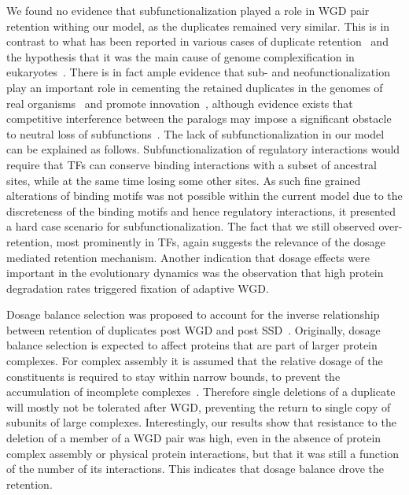 We found no evidence that subfunctionalization played a role in WGD pair retention withing our model, as the duplicates remained very similar. This is in contrast to what has been reported in various cases of duplicate retention~\cite{force_preservation_1999,blanc_functional_2004,duarte_expression_2006,hoof_conserved_2005,wapinski_gene_2010} and the hypothesis that it was the main cause of genome complexification in eukaryotes~\cite{lynch_origins_2003}. There is in fact ample evidence that sub- and neofunctionalization play an important role in cementing the retained duplicates in the genomes of real organisms~\cite{blanc_functional_2004,bekaert_two-phase_2011} and promote innovation~\cite{huminiecki_2r_2010,huminiecki_polyploidy_2012,de_smet_redundancy_2012}, although evidence exists that competitive interference between the paralogs may impose a significant obstacle to neutral loss of subfunctions~\cite{baker_following_2013}. 
The lack of subfunctionalization in our model can be explained as follows. Subfunctionalization of regulatory interactions would require that TFs can conserve binding interactions with a subset of ancestral sites, while at the same time losing some other sites. As such fine grained alterations of binding motifs was not possible within the current model due to the discreteness of the binding motifs and hence regulatory interactions, it presented a hard case scenario for subfunctionalization. The fact that we still observed over-retention, most prominently in TFs, again suggests the relevance of the dosage mediated retention mechanism. Another indication that dosage effects were important in the evolutionary dynamics was the observation that high protein degradation rates triggered fixation of adaptive WGD. 

Dosage balance selection was proposed to account for the inverse relationship between retention of duplicates post WGD and post SSD~\cite{birchler_gene_2007,hakes_all_2007,freeling_bias_2009,makino_ohnologs_2010,birchler_gene_2010,rodgers-melnick_contrasting_2012}. Originally, dosage balance selection is expected to affect proteins that are part of larger protein complexes. For complex assembly it is assumed that the relative dosage of the constituents is required to stay within narrow bounds, to prevent the accumulation of incomplete complexes~\cite{papp_dosage_2003,freeling_bias_2009,birchler_gene_2007}. Therefore single deletions of a duplicate will mostly not be tolerated after WGD, preventing the return to single copy of subunits of large complexes. Interestingly, our results show that resistance to the deletion of a member of a WGD pair was high, even in the absence of protein complex assembly or physical protein interactions, but that it was still a function of the number of its interactions. This indicates that dosage balance drove the retention.  

